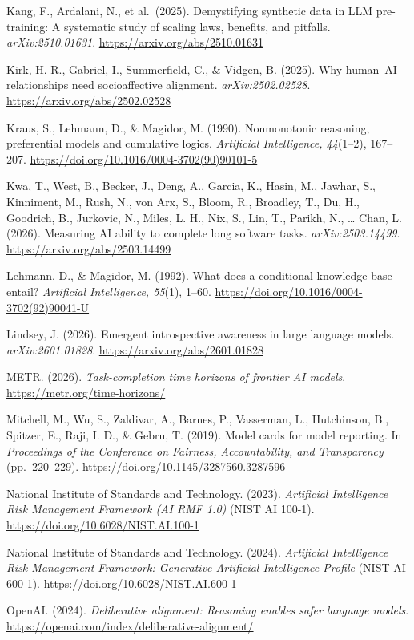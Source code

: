 \documentclass[
  11pt,
]{article}
\begin{document}
Kang, F., Ardalani, N., et al.~(2025). Demystifying synthetic data in
LLM pre-training: A systematic study of scaling laws, benefits, and
pitfalls. \emph{arXiv:2510.01631}.
\url{https://arxiv.org/abs/2510.01631}

Kirk, H. R., Gabriel, I., Summerfield, C., \& Vidgen, B. (2025). Why
human--AI relationships need socioaffective alignment.
\emph{arXiv:2502.02528}. \url{https://arxiv.org/abs/2502.02528}

Kraus, S., Lehmann, D., \& Magidor, M. (1990). Nonmonotonic reasoning,
preferential models and cumulative logics. \emph{Artificial
Intelligence, 44}(1--2), 167--207.
\url{https://doi.org/10.1016/0004-3702(90)90101-5}

Kwa, T., West, B., Becker, J., Deng, A., Garcia, K., Hasin, M., Jawhar,
S., Kinniment, M., Rush, N., von Arx, S., Bloom, R., Broadley, T., Du,
H., Goodrich, B., Jurkovic, N., Miles, L. H., Nix, S., Lin, T., Parikh,
N., \ldots{} Chan, L. (2026). Measuring AI ability to complete long
software tasks. \emph{arXiv:2503.14499}.
\url{https://arxiv.org/abs/2503.14499}

Lehmann, D., \& Magidor, M. (1992). What does a conditional knowledge
base entail? \emph{Artificial Intelligence, 55}(1), 1--60.
\url{https://doi.org/10.1016/0004-3702(92)90041-U}

Lindsey, J. (2026). Emergent introspective awareness in large language
models. \emph{arXiv:2601.01828}. \url{https://arxiv.org/abs/2601.01828}

METR. (2026). \emph{Task-completion time horizons of frontier AI
models}. \url{https://metr.org/time-horizons/}

Mitchell, M., Wu, S., Zaldivar, A., Barnes, P., Vasserman, L.,
Hutchinson, B., Spitzer, E., Raji, I. D., \& Gebru, T. (2019). Model
cards for model reporting. In \emph{Proceedings of the Conference on
Fairness, Accountability, and Transparency} (pp.~220--229).
\url{https://doi.org/10.1145/3287560.3287596}

National Institute of Standards and Technology. (2023). \emph{Artificial
Intelligence Risk Management Framework (AI RMF 1.0)} (NIST AI 100-1).
\url{https://doi.org/10.6028/NIST.AI.100-1}

National Institute of Standards and Technology. (2024). \emph{Artificial
Intelligence Risk Management Framework: Generative Artificial
Intelligence Profile} (NIST AI 600-1).
\url{https://doi.org/10.6028/NIST.AI.600-1}

OpenAI. (2024). \emph{Deliberative alignment: Reasoning enables safer
language models}. \url{https://openai.com/index/deliberative-alignment/}
\end{document}
